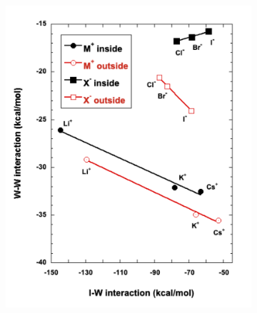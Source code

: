 \documentclass[11pt, proquest]{uwthesis}[2020/02/24]
\begin{document}
\begin{figure}
  \begin{subfigure}[t]{.5\textwidth}
    \centering
    \includegraphics[width=\linewidth]{Figures/Chapter_3/figure_9_tl.pdf}
  \end{subfigure}
  \hfill
  \begin{subfigure}[t]{.5\textwidth}
    \centering

\end{subfigure}
\end{figure}
\end{document}
